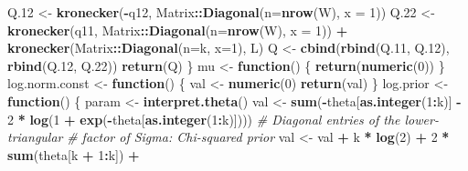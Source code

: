 \documentclass[
]{article}
\newenvironment{Shaded}{\begin{snugshade}}{\end{snugshade}}
\newcommand{\AttributeTok}[1]{\textcolor[rgb]{0.13,0.29,0.53}{#1}}
\newcommand{\CommentTok}[1]{\textcolor[rgb]{0.56,0.35,0.01}{\textit{#1}}}
\newcommand{\ControlFlowTok}[1]{\textcolor[rgb]{0.13,0.29,0.53}{\textbf{#1}}}
\newcommand{\DecValTok}[1]{\textcolor[rgb]{0.00,0.00,0.81}{#1}}
\newcommand{\FloatTok}[1]{\textcolor[rgb]{0.00,0.00,0.81}{#1}}
\newcommand{\FunctionTok}[1]{\textcolor[rgb]{0.13,0.29,0.53}{\textbf{#1}}}
\newcommand{\NormalTok}[1]{#1}
\newcommand{\OtherTok}[1]{\textcolor[rgb]{0.56,0.35,0.01}{#1}}
\newcommand{\SpecialCharTok}[1]{\textcolor[rgb]{0.81,0.36,0.00}{\textbf{#1}}}
\begin{document}
\begin{Shaded}
\begin{Highlighting}[]
\NormalTok{      Q}\FloatTok{.12} \OtherTok{\textless{}{-}} \FunctionTok{kronecker}\NormalTok{(}\SpecialCharTok{{-}}\NormalTok{q12, Matrix}\SpecialCharTok{::}\FunctionTok{Diagonal}\NormalTok{(}\AttributeTok{n=}\FunctionTok{nrow}\NormalTok{(W), }\AttributeTok{x =} \DecValTok{1}\NormalTok{))}
\NormalTok{      Q}\FloatTok{.22} \OtherTok{\textless{}{-}} \FunctionTok{kronecker}\NormalTok{(q11, Matrix}\SpecialCharTok{::}\FunctionTok{Diagonal}\NormalTok{(}\AttributeTok{n=}\FunctionTok{nrow}\NormalTok{(W), }\AttributeTok{x =} \DecValTok{1}\NormalTok{)) }\SpecialCharTok{+}
        \FunctionTok{kronecker}\NormalTok{(Matrix}\SpecialCharTok{::}\FunctionTok{Diagonal}\NormalTok{(}\AttributeTok{n=}\NormalTok{k, }\AttributeTok{x=}\DecValTok{1}\NormalTok{), L)}
\NormalTok{      Q }\OtherTok{\textless{}{-}} \FunctionTok{cbind}\NormalTok{(}\FunctionTok{rbind}\NormalTok{(Q}\FloatTok{.11}\NormalTok{, Q}\FloatTok{.12}\NormalTok{), }
                 \FunctionTok{rbind}\NormalTok{(Q}\FloatTok{.12}\NormalTok{, Q}\FloatTok{.22}\NormalTok{))}
      \FunctionTok{return}\NormalTok{(Q)}
\NormalTok{    \}}
\NormalTok{    mu }\OtherTok{\textless{}{-}} \ControlFlowTok{function}\NormalTok{() \{}
      \FunctionTok{return}\NormalTok{(}\FunctionTok{numeric}\NormalTok{(}\DecValTok{0}\NormalTok{))}
\NormalTok{    \}}
\NormalTok{    log.norm.const }\OtherTok{\textless{}{-}} \ControlFlowTok{function}\NormalTok{() \{}
\NormalTok{      val }\OtherTok{\textless{}{-}} \FunctionTok{numeric}\NormalTok{(}\DecValTok{0}\NormalTok{)}
      \FunctionTok{return}\NormalTok{(val)}
\NormalTok{    \}}
\NormalTok{    log.prior }\OtherTok{\textless{}{-}} \ControlFlowTok{function}\NormalTok{() \{}
\NormalTok{      param }\OtherTok{\textless{}{-}} \FunctionTok{interpret.theta}\NormalTok{()}
\NormalTok{      val }\OtherTok{\textless{}{-}} \FunctionTok{sum}\NormalTok{(}\SpecialCharTok{{-}}\NormalTok{theta[}\FunctionTok{as.integer}\NormalTok{(}\DecValTok{1}\SpecialCharTok{:}\NormalTok{k)] }\SpecialCharTok{{-}} \DecValTok{2} \SpecialCharTok{*} \FunctionTok{log}\NormalTok{(}\DecValTok{1} \SpecialCharTok{+} \FunctionTok{exp}\NormalTok{(}\SpecialCharTok{{-}}\NormalTok{theta[}\FunctionTok{as.integer}\NormalTok{(}\DecValTok{1}\SpecialCharTok{:}\NormalTok{k)])))}
      \CommentTok{\#\textquotesingle{} Diagonal entries of the lower{-}triangular}
      \CommentTok{\#\textquotesingle{} factor of Sigma: Chi{-}squared prior}
\NormalTok{      val }\OtherTok{\textless{}{-}}\NormalTok{ val }\SpecialCharTok{+}\NormalTok{ k }\SpecialCharTok{*} \FunctionTok{log}\NormalTok{(}\DecValTok{2}\NormalTok{) }\SpecialCharTok{+} \DecValTok{2} \SpecialCharTok{*} \FunctionTok{sum}\NormalTok{(theta[k }\SpecialCharTok{+} \DecValTok{1}\SpecialCharTok{:}\NormalTok{k]) }\SpecialCharTok{+} 

\end{Highlighting}
\end{Shaded}
\end{document}
